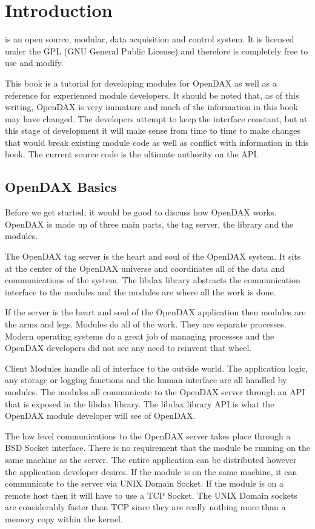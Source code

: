 \chapter{Introduction}
\opendax is an open source, modular, data acquisition and control system. It is licensed under the GPL (GNU General Public License) and therefore is completely free to use and modify.

This book is a tutorial for developing modules for OpenDAX as well as a reference for experienced module developers.  It should be noted that, as of this writing, OpenDAX is very immature and much of the information in this book may have changed.  The developers attempt to keep the interface constant, but at this stage of development it will make sense from time to time to make changes that would break existing module code as well as conflict with information in this book.  The current source code is the ultimate authority on the API.


\section{OpenDAX Basics}
Before we get started, it would be good to discuss how OpenDAX works.  OpenDAX is made up of three main parts, the tag server, the library and the modules.

The OpenDAX tag server is the heart and soul of the OpenDAX system.  It sits at the center of the OpenDAX universe and coordinates all of the data and communications of the system.  The libdax library abstracts the communication interface to the modules and the modules are where all the work is done.

If the server is the heart and soul of the OpenDAX application then modules are the arms and legs.  Modules do all of the work.  They are separate processes.  Modern operating systems do a great job of managing processes and the OpenDAX developers did not see any need to reinvent that wheel.  

Client Modules handle all of interface to the outside world.  The application logic, any storage or logging functions and the human interface are all handled by modules.  The modules all communicate to the OpenDAX server through an API that is exposed in the libdax library.  The libdax library API is what the OpenDAX module developer will see of OpenDAX.

The low level communications to the OpenDAX server takes place through a BSD Socket interface.  There is no requirement that the module be running on the same machine as the server.  The entire application can be distributed however the application developer desires.  If the module is on the same machine, it can communicate to the server via UNIX Domain Socket.  If the module is on a remote host then it will have to use a TCP Socket.  The UNIX Domain sockets are considerably faster than TCP since they are really nothing more than a memory copy within the kernel.

